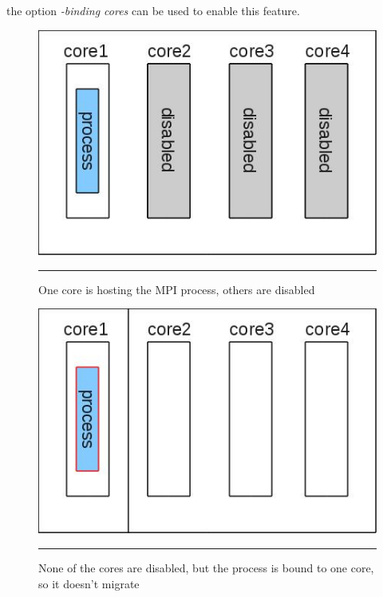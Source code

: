 the option \emph{-binding cores} can be used to enable this feature.
\begin{figure}[htbp]
  \centering
    \includegraphics[scale=0.4]{./Figures/disabled_cores.jpg}
    \rule{35em}{0.5pt}
  \caption[Disabled cores]{One core is hosting the MPI process, others are disabled}
  \label{fig:disabled_cores}
\end{figure}
\begin{figure}[htbp]
  \centering
    \includegraphics[scale=0.4]{./Figures/bind_to_core.jpg}
    \rule{35em}{0.5pt}
  \caption[Core binding]{None of the cores are disabled, but the
    process is bound to one core, so it doesn't migrate}
  \label{fig:core_binding}
\end{figure}

